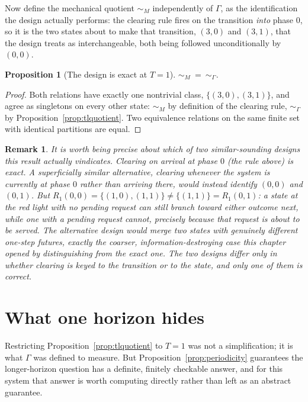 \documentclass[11pt]{report}
\newtheorem{proposition}{Proposition}[chapter]
\newtheorem{remark}{Remark}[chapter]
\begin{document}
Now define the mechanical quotient $\sim_M$ independently of
$\Gamma$, as the identification the design actually performs: the
clearing rule fires on the transition \emph{into} phase $0$, so it is
the two states about to make that transition, $(3,0)$ and $(3,1)$,
that the design treats as interchangeable, both being followed
unconditionally by $(0,0)$.

\begin{proposition}[The design is exact at $T=1$]
$\sim_M\ =\ \sim_\Gamma$.
\end{proposition}
\begin{proof}
Both relations have exactly one nontrivial class, $\{(3,0),(3,1)\}$,
and agree as singletons on every other state: $\sim_M$ by definition
of the clearing rule, $\sim_\Gamma$ by Proposition~\ref{prop:tlquotient}.
Two equivalence relations on the same finite set with identical
partitions are equal.
\end{proof}

\begin{remark}
It is worth being precise about which of two similar-sounding designs
this result actually vindicates. Clearing on arrival at phase $0$
(the rule above) is exact. A superficially similar alternative,
clearing whenever the system is currently \emph{at} phase $0$ rather
than arriving there, would instead identify $(0,0)$ and $(0,1)$. But
$R_1(0,0) = \{(1,0),(1,1)\} \neq \{(1,1)\} = R_1(0,1)$: a state at the
red light with no pending request can still branch toward either
outcome next, while one with a pending request cannot, precisely
because that request is about to be served. The alternative design
would merge two states with genuinely different one-step futures,
exactly the coarser, information-destroying case this chapter opened
by distinguishing from the exact one. The two designs differ only in
whether clearing is keyed to the transition or to the state, and only
one of them is correct.
\end{remark}

\section*{What one horizon hides}

Restricting Proposition~\ref{prop:tlquotient} to $T=1$ was not a
simplification; it is what $\Gamma$ was defined to measure. But
Proposition~\ref{prop:periodicity} guarantees the longer-horizon
question has a definite, finitely checkable answer, and for this
system that answer is worth computing directly rather than left as an
abstract guarantee.
\end{document}
